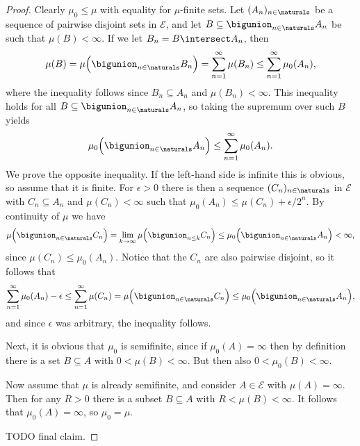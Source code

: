 \documentclass[article, a4paper, 11pt, oneside]{memoir}
\numberwithin{equation}{chapter}
\newcommand{\calE}{\mathcal{E}}
\begin{document}
\begin{proof}
    Clearly $\mu_0 \leq \mu$ with equality for $\mu$-finite sets. Let $(A_n)_{n \in \naturals}$ be a sequence of pairwise disjoint sets in $\calE$, and let $B \subseteq \bigunion_{n \in \naturals} A_n$ be such that $\mu(B) < \infty$. If we let $B_n = B \intersect A_n$, then
    \begin{equation*}
        \mu(B)
            = \mu \Bigl( \bigunion_{n \in \naturals} B_n \Bigr)
            = \sum_{n=1}^\infty \mu(B_n)
            \leq \sum_{n=1}^\infty \mu_0(A_n),
    \end{equation*}
    where the inequality follows since $B_n \subseteq A_n$ and $\mu(B_n) < \infty$. This inequality holds for all $B \subseteq \bigunion_{n \in \naturals} A_n$, so taking the supremum over such $B$ yields
    \begin{equation*}
        \mu_0 \Bigl( \bigunion_{n \in \naturals} A_n \Bigr)
            \leq \sum_{n=1}^\infty \mu_0(A_n).
    \end{equation*}
    We prove the opposite inequality. If the left-hand side is infinite this is obvious, so assume that it is finite. For $\epsilon > 0$ there is then a sequence $(C_n)_{n \in \naturals}$ in $\calE$ with $C_n \subseteq A_n$ and $\mu(C_n) < \infty$ such that $\mu_0(A_n) \leq \mu(C_n) + \epsilon/2^n$. By continuity of $\mu$ we have
    \begin{equation*}
        \mu \Bigl( \bigunion_{n \in \naturals} C_n \Bigr)
            = \lim_{k \to \infty} \mu \Bigl( \bigunion_{n \leq k} C_n \Bigr)
            \leq \mu_0 \Bigl( \bigunion_{n \in \naturals} A_n \Bigr)
            < \infty,
    \end{equation*}
    since $\mu(C_n) \leq \mu_0(A_n)$. Notice that the $C_n$ are also pairwise disjoint, so it follows that
    \begin{equation*}
        \sum_{n=1}^\infty \mu_0(A_n) - \epsilon
            \leq \sum_{n=1}^\infty \mu(C_n)
            = \mu \Bigl( \bigunion_{n \in \naturals} C_n \Bigr)
            \leq \mu_0 \Bigl( \bigunion_{n \in \naturals} A_n \Bigr),
    \end{equation*}
    and since $\epsilon$ was arbitrary, the inequality follows.

    Next, it is obvious that $\mu_0$ is semifinite, since if $\mu_0(A) = \infty$ then by definition there is a set $B \subseteq A$ with $0 < \mu(B) < \infty$. But then also $0 < \mu_0(B) < \infty$.

    Now assume that $\mu$ is already semifinite, and consider $A \in \calE$ with $\mu(A) = \infty$. Then for any $R > 0$ there is a subset $B \subseteq A$ with $R < \mu(B) < \infty$. It follows that $\mu_0(A) = \infty$, so $\mu_0 = \mu$.

    TODO final claim.
\end{proof}
\end{document}
